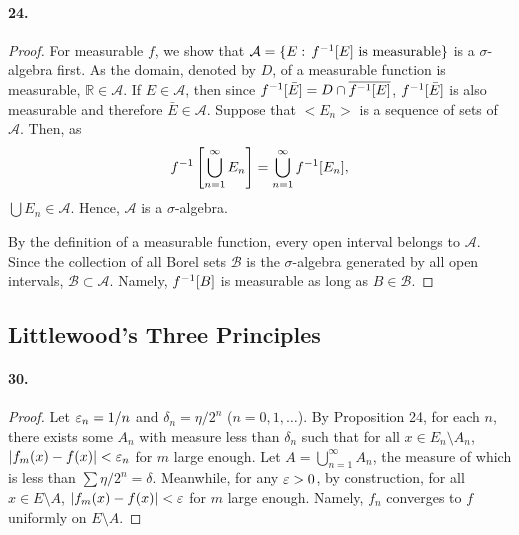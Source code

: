   \paragraph{24.}
  \begin{proof}
    For measurable $f$, we show that $\mathcal{A}=\{E:\, f^{-1}[E]\text{ is 
    measurable}\}$ is a $\sigma$-algebra first. As the domain, denoted by $D$, 
    of a measurable function is measurable, $\mathbb{R}\in\mathcal{A}$. If
    $E\in\mathcal{A}$, then since $f^{-1}[\bar{E}]= D\cap \overline{f^{-1}[E]}$,
    $f^{-1}[\bar{E}]$ is also measurable and therefore $\bar{E}\in\mathcal{A}$.
    Suppose that $<E_n>$ is a sequence of sets of $\mathcal{A}$. Then, as
    \[
      f^{-1}\left[\bigcup_{n=1}^\infty E_n\right] = 
      \bigcup_{n=1}^\infty f^{-1}[E_n],
    \]
    $\bigcup E_n\in\mathcal{A}$. Hence, $\mathcal{A}$ is a $\sigma$-algebra.\par
    By the definition of a measurable function, every open interval belongs to 
    $\mathcal{A}$. Since the collection of all Borel sets $\mathcal{B}$ is the
    $\sigma$-algebra generated by all open intervals, $\mathcal{B}\subset
    \mathcal{A}$. Namely, $f^{-1}[B]$ is measurable as long as $B\in\mathcal{B}$.
  \end{proof}



\subsection{Littlewood's Three Principles}
  \paragraph{30.}
  \begin{proof}
    Let $\varepsilon_n=1/n$ and $\delta_n =\eta/2^n$ ($n=0,1,\dots$). By Proposition
    24, for each $n$, there exists some $A_n$ with measure less than $\delta_n$
    such that for all $x\in E_n\setminus A_n$, $|f_m(x) - f(x)|<\varepsilon_n$ for $m$
    large enough. Let $A=\bigcup_{n=1}^\infty A_n$, the measure of which is less
    than $\sum \eta/2^n=\delta$. Meanwhile, for any $\varepsilon>0$, by construction, 
    for all $x\in E\setminus A$, $|f_m(x)-f(x)|<\varepsilon$ for $m$ large enough. 
    Namely, $f_n$ converges to $f$ uniformly on $E\setminus A$.
  \end{proof}
    
